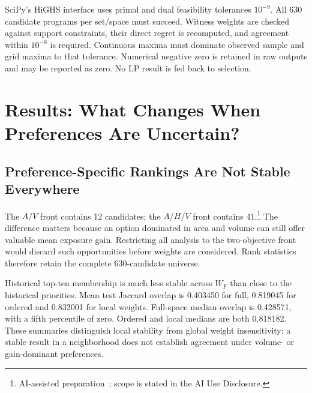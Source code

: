 \documentclass{llncs}
\newcommand{\aidraft}{\footnote{AI-assisted preparation~\cite{openai2026}; scope is stated in the AI Use Disclosure.}}
\begin{document}
SciPy's HiGHS interface uses primal and dual feasibility tolerances $10^{-9}$. All 630 candidate programs per set/space must succeed. Witness weights are checked against support constraints, their direct regret is recomputed, and agreement within $10^{-8}$ is required. Continuous maxima must dominate observed sample and grid maxima to that tolerance. Numerical negative zero is retained in raw outputs and may be reported as zero. No LP result is fed back to selection.

\section{Results: What Changes When Preferences Are Uncertain?}
\subsection{Preference-Specific Rankings Are Not Stable Everywhere}
The $A/V$ front contains 12 candidates; the $A/H/V$ front contains 41.\aidraft{} The difference matters because an option dominated in area and volume can still offer valuable mean exposure gain. Restricting all analysis to the two-objective front would discard such opportunities before weights are considered. Rank statistics therefore retain the complete 630-candidate universe.

Historical top-ten membership is much less stable across $W_F$ than close to the historical priorities. Mean test Jaccard overlap is 0.403450 for full, 0.819045 for ordered and 0.832001 for local weights. Full-space median overlap is 0.428571, with a fifth percentile of zero. Ordered and local medians are both 0.818182. These summaries distinguish local stability from global weight insensitivity: a stable result in a neighborhood does not establish agreement under volume- or gain-dominant preferences.
\end{document}
